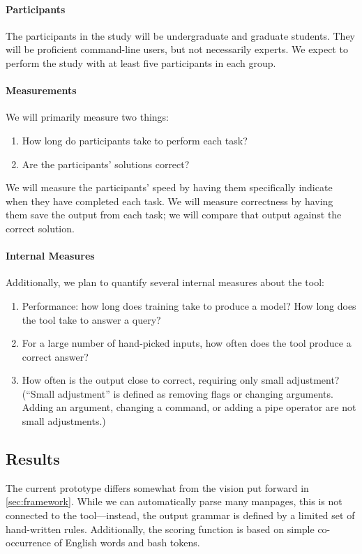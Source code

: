 \paragraph{Participants} The participants in the study will be undergraduate and
graduate students. They will be proficient command-line users, but not
necessarily experts. We expect to perform the study with at least five
participants in each group.

\paragraph{Measurements} We will primarily measure two things:
\begin{enumerate}\itemsep-1pt
    \item How long do participants take to perform each task?
    \item Are the participants' solutions correct?
\end{enumerate}
We will measure the participants' speed by having them specifically indicate
when they have completed each task. We will measure correctness by having them
save the output from each task; we will compare that output against the correct
solution.

\paragraph{Internal Measures} Additionally, we plan to quantify several internal
measures about the tool:
\begin{enumerate}\itemsep-1pt
    \item Performance: how long does training take to produce a model? How
        long does the tool take to answer a query?
    \item For a large number of hand-picked inputs, how often does the
        tool produce a correct answer?
    \item How often is the output close to correct, requiring only small
        adjustment? (``Small adjustment'' is defined as removing flags or
        changing arguments. Adding an argument, changing a command, or
        adding a pipe operator are not small adjustments.)
\end{enumerate}

\subsection{Results}

The current prototype differs somewhat from the vision put forward in
\autoref{sec:framework}. While we can automatically parse many manpages, this is
not connected to the tool---instead, the output grammar is defined by a limited
set of hand-written rules. Additionally, the scoring function is based on simple
co-occurrence of English words and bash tokens.

